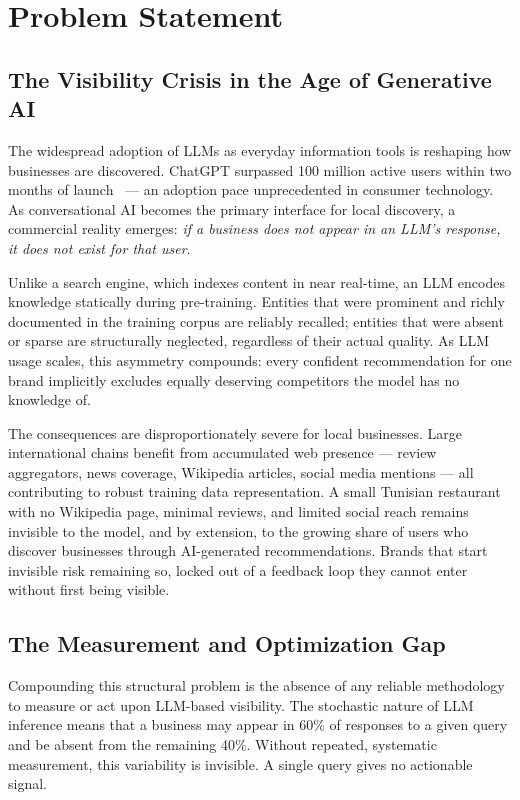 \section{Problem Statement}

\subsection*{The Visibility Crisis in the Age of Generative AI}

The widespread adoption of LLMs as everyday information tools is reshaping how
businesses are discovered. ChatGPT surpassed 100 million active users within two
months of launch~\cite{aggarwal2023geo} — an adoption pace unprecedented in consumer
technology. As conversational AI becomes the primary interface for local discovery,
a commercial reality emerges: \textit{if a business does not appear in an LLM's
response, it does not exist for that user}.

Unlike a search engine, which indexes content in near real-time, an LLM encodes
knowledge statically during pre-training. Entities that were prominent and richly
documented in the training corpus are reliably recalled; entities that were absent or
sparse are structurally neglected, regardless of their actual quality. As LLM usage
scales, this asymmetry compounds: every confident recommendation for one brand
implicitly excludes equally deserving competitors the model has no knowledge of.

The consequences are disproportionately severe for local businesses. Large
international chains benefit from accumulated web presence — review aggregators, news
coverage, Wikipedia articles, social media mentions — all contributing to robust
training data representation. A small Tunisian restaurant with no Wikipedia page,
minimal reviews, and limited social reach remains invisible to the model, and by
extension, to the growing share of users who discover businesses through AI-generated
recommendations. Brands that start invisible risk remaining so, locked out of a
feedback loop they cannot enter without first being visible.

\subsection*{The Measurement and Optimization Gap}

Compounding this structural problem is the absence of any reliable methodology to
measure or act upon LLM-based visibility. The stochastic nature of LLM inference
means that a business may appear in 60\% of responses to a given query and be absent
from the remaining 40\%. Without repeated, systematic measurement, this variability
is invisible. A single query gives no actionable signal.

